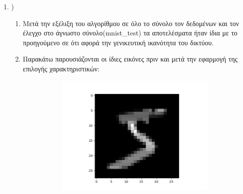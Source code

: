 \documentclass[12pt,a4paper]{article}
\newcommand{\tl}{\textlatin}
\begin{document}
\begin{enumerate}
\begin{enumerate}
                    \end{enumerate}
                \item)\\

                            \begin{enumerate}
                                \item Μετά την εξέλιξη του αλγορίθμου σε όλο το
                                    σύνολο τον δεδομένων και τον έλεγχο στο
                                    άγνωστο σύνολο(\tl{mnist\_test}) τα
                                    αποτελέσματα ήταν ίδια με το προηγούμενο σε
                                    ότι αφορά την γενικευτική ικανότητα του
                                    δικτύου.
                                \item Παρακάτω παρουσιάζονται οι ίδιες εικόνες πριν και μετά
                                    την εφαρμογή της επιλογής χαρακτηριστικών: 
                                    \\
                            \begin{figure}[H]
                                \begin{subfigure}{0.5\textwidth}
                                    \raggedleft
                                    \includegraphics[width=\textwidth]{images/im7.png}
                                \end{subfigure}
                                \begin{subfigure}{0.5\textwidth}
                                    \raggedleft

\end{subfigure}
\end{figure}
\end{enumerate}
\end{enumerate}
\end{document}
